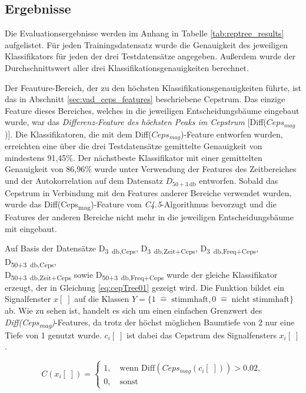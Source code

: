 \subsection{Ergebnisse}
\label{sec:vad_results}

Die Evaluationsergebnisse werden im Anhang in Tabelle \ref{tab:reptree_results} aufgelistet. Für jeden Trainingsdatensatz wurde die Genauigkeit des jeweiligen Klassifikators für jeden der drei Testdatensätze angegeben. Außerdem wurde der Durchschnittswert aller drei Klassifikationsgenauigkeiten berechnet.

Der Feauture-Bereich, der zu den höchsten Klassifikationsgenauigkeiten führte, ist das in Abschnitt \ref{sec:vad_ceps_features} beschriebene Cepstrum. Das einzige Feature dieses Bereiches, welches in die jeweiligen Entscheidungsbäume eingebaut wurde, war das \emph{Differenz-Feature des höchsten Peaks im Cepstrum} [Diff($Ceps_{mag}$)]. Die Klassifikatoren, die mit dem Diff($Ceps_{mag}$)-Feature entworfen wurden, erreichten eine über die drei Testdatensätze gemittelte Genauigkeit von mindestens 91,45\%. Der nächstbeste Klassifikator mit einer gemittelten Genauigkeit von 86,96\% wurde unter Verwendung der Features des Zeitbereiches und der Autokorrelation auf dem Datensatz $D_{50+\SI{3}{\decibel}}$ entworfen. Sobald das Cepstrum in Verbindung mit den Features anderer Bereiche verwendet wurden, wurde das Diff(Ceps\textsubscript{mag})-Feature vom \emph{C4.5}-Algorithmus bevorzugt und die Features der anderen Bereiche nicht mehr in die jeweiligen Entscheidungsbäume mit eingebaut.

Auf Basis der Datensätze D\textsubscript{\SI{3}{\decibel},Ceps}, D\textsubscript{\SI{3}{\decibel},Zeit+Ceps}, D\textsubscript{\SI{3}{\decibel},Freq+Ceps}, D\textsubscript{50+\SI{3}{\decibel},Ceps}, \\ D\textsubscript{50+\SI{3}{\decibel},Zeit+Ceps} sowie D\textsubscript{50+\SI{3}{\decibel},Freq+Ceps} wurde der gleiche Klassifikator erzeugt, der in Gleichung \ref{eq:cepTree01} gezeigt wird. Die Funktion bildet ein Signalfenster $x[\;]$ auf die Klassen $Y = \{ 1 \; \hat{=} \; \text{stimmhaft}, 0 \; \hat{=} \; \text{nicht stimmhaft}\}$ ab. Wie zu sehen ist, handelt es sich um einen einfachen Grenzwert des \emph{Diff(Ceps\textsubscript{mag})}-Features, da trotz der höchst möglichen Baumtiefe von 2 nur eine Tiefe von 1 genutzt wurde. $c_i[\;]$ ist dabei das Cepstrum des Signalfensters $x_i[\;]$.

\begin{equation}
C(x_i[\;]) = \begin{cases}
1, \quad \text{wenn  Diff}(Ceps_{mag}(c_i[\;])) > 0.02, \\
0, \quad \text{sonst}
\end{cases}
\label{eq:cepTree01}
\end{equation}


